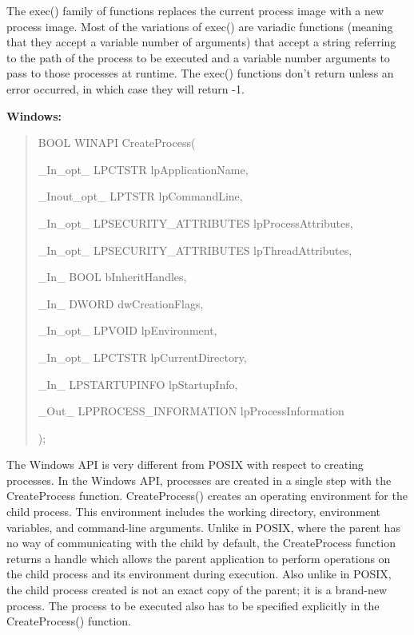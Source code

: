 \documentclass[letterpaper,10pt,titlepage]{article}
\newcommand{\tab}{\hspace*{2em}} %
\begin{document}
\begin{enumerate}
\tab The exec() family of functions replaces the current process image with a new process image. Most of the variations of exec() are variadic functions (meaning that they accept a variable number of arguments) that accept a string referring to the path of the process to be executed and a variable number arguments to pass to those processes at runtime. The exec() functions don't return unless an error occurred, in which case they will return -1. \newline


\textbf{Windows:} 

\begin{quote}
BOOL WINAPI CreateProcess(

\tab\_In\_opt\_     LPCTSTR lpApplicationName,

\tab\_Inout\_opt\_  LPTSTR lpCommandLine,

\tab\_In\_opt\_     LPSECURITY\_ATTRIBUTES lpProcessAttributes,

\tab\_In\_opt\_     LPSECURITY\_ATTRIBUTES lpThreadAttributes,

\tab\_In\_         BOOL bInheritHandles,

\tab\_In\_         DWORD dwCreationFlags,

\tab\_In\_opt\_     LPVOID lpEnvironment,

\tab\_In\_opt\_     LPCTSTR lpCurrentDirectory,

\tab\_In\_         LPSTARTUPINFO lpStartupInfo,

\tab\_Out\_        LPPROCESS\_INFORMATION lpProcessInformation

);
\end{quote}

\tab The Windows API is very different from POSIX with respect to creating processes. In the Windows API, processes are created in a single step with the CreateProcess function. CreateProcess() creates an operating environment for the child process. This environment includes the working directory, environment variables, and command-line arguments. Unlike in POSIX, where the parent has no way of communicating with the child by default, the CreateProcess function returns a handle which allows the parent application to perform operations on the child process and its environment during execution. Also unlike in POSIX, the child process created is not an exact copy of the parent; it is a brand-new process. The process to be executed also has to be specified explicitly in the CreateProcess() function. \newline


\end{enumerate}
\end{document}

